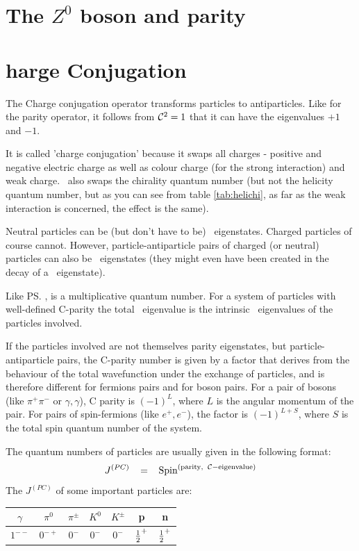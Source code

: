 \section{The $Z^0$ boson and parity}


\section{\cs{}harge Conjugation}
\label{sec:ChargeConjugation}
 The Charge conjugation operator transforms particles to
 antiparticles. Like for the parity operator, it follows from $\mathcal{C}^2=1$
 that it can have the eigenvalues $+1$ and $-1$.

 It is called 'charge conjugation' because it swaps all charges -
 positive and negative electric charge as well as colour charge (for
 the strong interaction) and weak charge. \cs\ also swaps the
 chirality quantum number (but not the helicity quantum number, but as
 you can see from table \ref{tab:helichi}, as far as the weak
 interaction is concerned, the effect is the same).

 Neutral particles can be (but don't have to be) \cs\
 eigenstates. Charged particles of course cannot. However,
 particle-antiparticle pairs of charged (or neutral) particles can
 also be \cs\ eigenstates (they might even have been created in the
 decay of a \cs\ eigenstate).

 Like \ps, \cs is a multiplicative quantum number. For a system of
 particles with well-defined C-parity the total \cs\ eigenvalue is the
 intrinsic \cs\ eigenvalues of the particles involved. 

 If the particles involved are not themselves parity eigenstates, but
 particle-antiparticle pairs, the C-parity number is given by a factor
 that derives from the behaviour of the total wavefunction under the
 exchange of particles, and is therefore different for fermions pairs
 and for boson pairs. For a pair of bosons (like $\pi^+\pi^-$ or
 $\gamma, \gamma$), C parity is $(-1)^{L}$, where $L$ is the angular
 momentum of the pair. For pairs of spin-\half fermions (like $e^+,
 e^-$), the factor is $(-1)^{L+S}$, where $S$ is the total spin
 quantum number of the system.

 The quantum numbers of particles are usually given in the following
 format:
\begin{equation}
%
  J^{(PC)} \;\;\;= \;\;\;\mbox{Spin}^{(\mathrm{parity,\;\; \cs-eigenvalue})}
%
\end{equation}
 The $J^{(PC)}$ of some important particles are:\\
\begin{tabular}{|*{7}{c|}}
\hline
 $\gamma$ & $\pi^0$ & $\pi^{\pm}$ & $K^0$   & $K^{\pm}$ & p & n
\\\hline
 $1^{--}$ & $0^{-+}$& $0^{-}$     & $0^{-}$ & $0^{-}$   & $\frac{1}{2}^{+}$
 & $\frac{1}{2}^{+}$
\\
\hline
\end{tabular}

